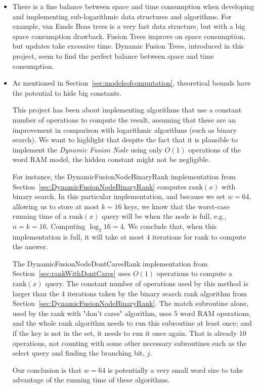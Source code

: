 \begin{itemize}
    \item
    There is a fine balance between space and time consumption when developing and implementing sub-logarithmic data structures and algorithms. For example, van Emde Boas trees is a very fast data structure, but with a big space consumption drawback. Fusion Trees improve on space consumption, but updates take excessive time. Dynamic Fusion Trees, introduced in this project, seem to find the perfect balance between space and time consumption.
    
    \item
    As mentioned in Section~\ref{sec:modelsofcomputation}, theoretical bounds have the potential to hide big constants.
    
    This project has been about implementing algorithms that use a constant number of operations to compute the result, assuming that these are an improvement in comparison with logarithmic algorithms (such as binary search).
    We want to highlight that despite the fact that it is plausible to implement the \textit{Dynamic Fusion Node} using only $O(1)$ operations of the word RAM model, the hidden constant might not be negligible.
    
    For instance, the {\ttfamily DynamicFusionNodeBinaryRank} implementation from Section~\ref{sec:DynamicFusionNodeBinaryRank} computes $\text{rank}(x)$ with binary search.
    In this particular implementation, and because we set $w = 64$, allowing us to store at most $k = 16$ keys, we know that the worst-case running time of a $\text{rank}(x)$ query will be when the node is full, e.g., $n = k = 16$.
    Computing $\log_2 16 = 4$.
    We conclude that, when this implementation is full, it will take at most $4$ iterations for rank to compute the answer.
    
    The {\ttfamily DynamicFusionNodeDontCaresRank} implementation from Section~\ref{sec:rankWithDontCares} uses $O(1)$ operations to compute a $\text{rank}(x)$ query. The constant number of operations used by this method is larger than the $4$ iterations taken by the binary search rank algorithm from Section~\ref{sec:DynamicFusionNodeBinaryRank}.
    The {\ttfamily match} subroutine alone, used by the rank with "don't cares" algorithm, uses $5$ word RAM operations, and the whole rank algorithm needs to run this subroutine at least once; and if the key is not in the set, it needs to run it once again. That is already $10$ operations, not counting with some other necessary subroutines such as the select query and finding the branching bit, $j$.
    
    Our conclusion is that $w = 64$ is potentially a very small word size to take advantage of the running time of these algorithms.
\end{itemize}

